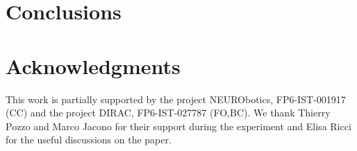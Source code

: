 \documentclass[conference,letterpaper,10pt]{ieeeconf}
\begin{document}
\section{Conclusions}
\label{sec:concl}



\section*{Acknowledgments}

This work is partially supported by the project NEURObotics,
FP6-IST-001917 (CC) and the project DIRAC, FP6-IST-027787 (FO,BC). We
thank Thierry Pozzo and Marco Jacono for their
support during the experiment and Elisa Ricci for the useful discussions
on the paper.

{\small


}
\end{document}
